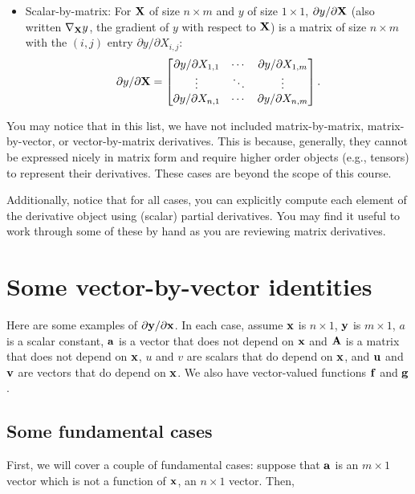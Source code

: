 \begin{itemize}
  \item Scalar-by-matrix: For ${\bf X}$ of size $n\times m$ and $y$ of size $1\times 1$,
        $\partial y/\partial {\bf X}$ (also written $\nabla_{\bf X} y$, the gradient of $y$ with respect to ${\bf X}$)
        is a matrix of size $n\times m$ with the $(i, j)$ entry $\partial y/\partial X_{i, j}$:
        \begin{align*}
          \partial y/\partial {\bf X}=
          \begin{bmatrix}
            \partial y/\partial X_{1,1} & \cdots & \partial y/\partial X_{1,m} \\
            \vdots                      & \ddots & \vdots                      \\
            \partial y/\partial X_{n,1} & \cdots & \partial y/\partial X_{n,m} \\
          \end{bmatrix}.
        \end{align*}

\end{itemize}

You may notice that in this list, we have not included matrix-by-matrix, matrix-by-vector, or vector-by-matrix derivatives.
This is because, generally, they cannot be expressed nicely in matrix form and require higher order objects (e.g., tensors)
to represent their derivatives. These cases are beyond the scope of this course.

Additionally, notice that for all cases, you can explicitly compute each element of the derivative object using (scalar) partial derivatives. You may find it useful to work through some of these by hand as you are reviewing matrix derivatives.


\section{Some vector-by-vector identities}
Here are some examples of $\partial {\bf y} / \partial {\bf x}$.  In each case,
assume ${\bf x}$ is $n \times 1$, ${\bf y}$ is $m \times 1$, $a$ is a scalar
constant, ${\bf a}$ is a vector that does not depend on ${\bf x}$ and ${\bf A}$ is a matrix that does
not depend on ${\bf x}$, $u$ and $v$ are scalars that do depend on ${\bf x}$, and
${\bf u}$ and ${\bf v}$ are vectors that do depend on ${\bf x}$.  We also have
vector-valued functions ${\bf f}$ and ${\bf g}$.

\subsection{Some fundamental cases}
First, we will cover a couple of fundamental cases: suppose that ${\bf a}$ is an $m \times 1$ vector which is
not a function of ${\bf x}$, an $n\times1$ vector. Then,

